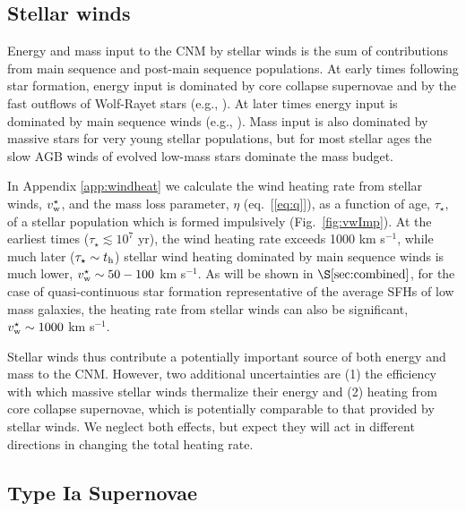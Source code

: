 \documentclass[usenatbib,fleqn]{mn2e}
\begin{document}
\subsection{Stellar winds} 

Energy and mass input to the CNM by stellar winds is the sum of
contributions from main sequence and post-main sequence populations.
At early times following star formation, energy input is dominated by
core collapse supernovae and by the fast outflows of Wolf-Rayet stars
(e.g., \citealt{VossDiehl+:2009a}).  At later times energy input is
dominated by main sequence winds (e.g.,
\citealt{NaimanSoares-Furtado+:2013a}).  Mass input is also dominated
by massive stars for very young stellar populations, but for most
stellar ages the slow AGB winds of evolved low-mass stars dominate the
mass budget.

In Appendix \ref{app:windheat} we calculate the wind heating rate from
stellar winds, $v_{\rm w}^{\star}$, and the mass loss parameter,
$\eta$ (eq.~[\ref{eq:q}]), as a function of age, $\tau_{\star}$, of a
stellar population which is formed impulsively (Fig.~\ref{fig:vwImp}).
At the earliest times ($\tau_{\star} \lesssim 10^{7}$ yr), the wind
heating rate exceeds 1000 km s$^{-1}$, while much later ($\tau_{\star}
\sim t_{\rm h}$) stellar wind heating dominated by main sequence winds
is much lower, $v^{\star}_{\rm w} \sim 50-100 $ km s$^{-1}$.  As will
be shown in $\S\ref{sec:combined}$, for the case of quasi-continuous
star formation representative of the average SFHs of low mass
galaxies, the heating rate from stellar winds can also be significant,
$v_{\rm w}^{\star} \sim 1000$ km s$^{-1}$.

Stellar winds thus contribute a potentially important source of both
energy and mass to the CNM.  However, two additional uncertainties are
(1) the efficiency with which massive stellar winds thermalize their
energy and (2) heating from core collapse supernovae, which is
potentially comparable to that provided by stellar winds.  We neglect
both effects, but expect they will act in different directions in
changing the total heating rate.

\subsection{Type Ia Supernovae} 
\end{document}
